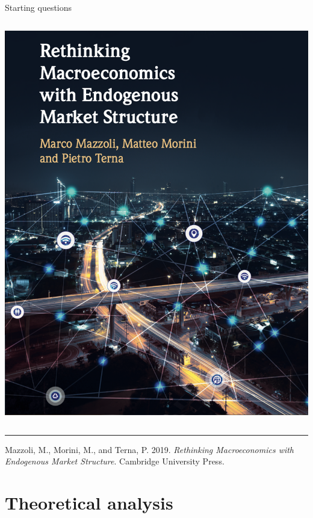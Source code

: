 \documentclass[9pt]{beamer}
\begin{document}
\begin{frame}{Starting questions}
\begin{columns}[T]
 \begin{column}{.4\textwidth}
 \begin{block}{}
 \includegraphics[scale=0.25]{cover.png}
  \end{block}
  \end{column}
    
\end{columns}


\smallskip

\noindent\rule{8cm}{0.4pt}
\scriptsize

Mazzoli, M., Morini, M., and Terna, P. 2019. \emph{Rethinking Macroeconomics with Endogenous Market Structure}. Cambridge University Press.

\end{frame}

\section{Theoretical analysis}
\end{document}
